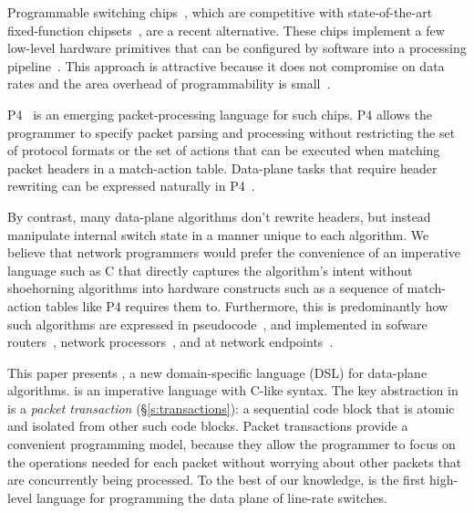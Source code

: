 Programmable switching chips~\cite{flexpipe, xpliant, rmt}, which are
competitive with state-of-the-art fixed-function chipsets~\cite{trident,
tomahawk, mellanox}, are a recent alternative.  These chips implement a few
low-level hardware primitives that can be configured by software into a
processing pipeline~\cite{xpliant_sdk,xpliant_sdk2,intel_sdk}. This approach is
attractive because it does not compromise on data rates and the area overhead
of programmability is small~\cite{rmt}.

P4~\cite{p4, p4spec} is an emerging packet-processing language for
such chips. P4 allows the programmer to specify packet parsing and
processing without restricting the set of protocol formats or the set
of actions that can be executed when matching packet headers in a
match-action table. Data-plane tasks that require header rewriting can
be expressed naturally in P4~\cite{dc_p4}.

By contrast, many data-plane algorithms don't rewrite headers, but instead
manipulate internal switch state in a manner unique to each algorithm. We
believe that network programmers would prefer the convenience of an imperative
language such as C that directly captures the algorithm's intent without
shoehorning algorithms into hardware constructs such as a sequence of
match-action tables like P4 requires them to.  Furthermore, this is
predominantly how such algorithms are expressed in pseudocode~\cite{red, csfq,
codel_code, avq, blue}, and implemented in sofware routers~\cite{click, dpdk,
routebricks}, network processors~\cite{packetc, nova}, and at network
endpoints~\cite{qdisc}.

This paper presents \pktlanguage, a new domain-specific language (DSL) for
data-plane algorithms.  \pktlanguage is an imperative language with C-like
syntax. The key abstraction in \pktlanguage is a {\em packet transaction}
(\S\ref{s:transactions}): a sequential code block that is atomic and isolated
from other such code blocks. Packet transactions provide a convenient
programming model, because they allow the programmer to focus on the operations
needed for each packet without worrying about other packets that are
concurrently being processed. To the best of our knowledge, \pktlanguage is the
first high-level language for programming the data plane of line-rate switches.


